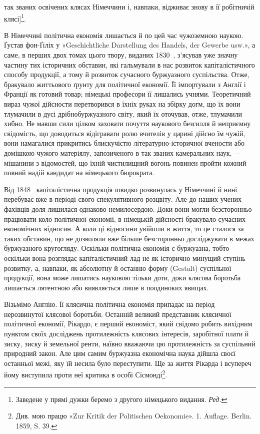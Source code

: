 \parcont{}  %
так званих освічених клясах Німеччини і, навпаки, відживає
знову в її робітничій клясі]\footnote*{
Заведене у прямі дужки беремо з другого німецького видання. \emph{Ред.}
}.

В Німеччині політична економія лишається й по цей час чужоземною
наукою. Ґустав фон-Ґіліх у «Geschichtliche Darstellung
des Handels, der Gewerbe usw.», а саме, в перших двох томах
цього твору, виданих 1830~, з’ясував уже значну частину тих
історичних обставин, які гальмували в нас розвиток капіталістичного
способу продукції, а тому й розвиток сучасного буржуазного
суспільства. Отже, бракувало життьового ґрунту для політичної
економії. Її імпортували з Англії і Франції як готовий товар;
німецькі професори її лишались учнями. Теоретичний вираз чужої
дійсности перетворився в їхніх руках на збірку догм, що їх
вони тлумачили в дусі дрібнобуржуазного світу, який їх оточував,
отже, тлумачили хибно. Не мавши сили цілком заховати почуття
наукового безсилля й неприємну свідомість, що доводиться
відігравати ролю вчителів у царині дійсно їм чужій, вони намагалися
прикритись блискучістю літературно-історичної вчености
або домішкою чужого матеріялу, запозиченого в так званих камеральних
наук, — мішанини з відомостей, що їхній чистилищний
вогонь повинен пройти кожний повний надій кандидат на
німецького бюрократа.

Від 1848~ капіталістична продукція швидко розвинулась у
Німеччині й нині перебуває вже в періоді свого спекулятивного
розцвіту. Але до наших учених фахівців доля лишилася однаково
немилосердою. Доки вони могли безсторонньо працювати коло
політичної економії, в німецькій дійсності бракувало сучасних економічних
відносин. А коли ці відносини увійшли в життя, то це сталося
за таких обставин, що не дозволяли вже більше безсторонньо
досліджувати в межах буржуазного кругогляду. Оскільки політична
економія є буржуазна, тобто оскільки вона розглядає капіталістичний
лад не як історично минущий ступінь розвитку,
а, навпаки, як абсолютну й останню форму (Gestalt) суспільної
продукції, вона може лишатись науковою тільки доти, доки клясова
боротьба лишається лятентною або виявляється лише в
поодиноких явищах.

Візьмімо Англію. Її клясична політична економія припадає на
період нерозвинутої клясової боротьби. Останній великий представник
клясичної політичної економії, Рікардо, є перший економіст,
який свідомо робить вихідним пунктом своїх досліджень
протилежність клясових інтересів, заробітної плати й зиску, зиску
й земельної ренти, наївно вважаючи цю протилежність за суспільний
природний закон. Але цим самим буржуазна економічна
наука дійшла своєї останньої межі, яку їй несила було переступити.
Ще за життя Рікарда і всупереч йому виступила проти
неї критика в особі Сісмонді\footnote{
Див. мою працю «Zur Kritik der Politischen Oekonomie». 1. Auflage.
Berlin. 1859, S. 39.
}.
